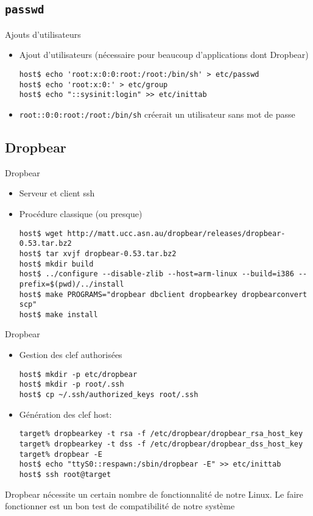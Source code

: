 \subsection{\texttt{passwd}}

\begin{frame}[fragile=singleslide]{Ajouts d'utilisateurs}
  \begin{itemize}
  \item Ajout d'utilisateurs  (nécessaire pour beaucoup d'applications
    dont Dropbear)
    \begin{lstlisting}
host$ echo 'root:x:0:0:root:/root:/bin/sh' > etc/passwd
host$ echo 'root:x:0:' > etc/group
host$ echo "::sysinit:login" >> etc/inittab 
    \end{lstlisting}
  \item  \verb'root::0:0:root:/root:/bin/sh'  créerait un  utilisateur
    sans mot de passe
  \end{itemize}
\end{frame}

\subsection{Dropbear}

\begin{frame}[fragile=singleslide]{Dropbear}
  \begin{itemize}
  \item Serveur et client ssh
  \item Procédure classique (ou presque)
    \begin{lstlisting}
host$ wget http://matt.ucc.asn.au/dropbear/releases/dropbear-0.53.tar.bz2
host$ tar xvjf dropbear-0.53.tar.bz2
host$ mkdir build
host$ ../configure --disable-zlib --host=arm-linux --build=i386 --prefix=$(pwd)/../install
host$ make PROGRAMS="dropbear dbclient dropbearkey dropbearconvert scp"
host$ make install
    \end{lstlisting}
  \end{itemize}
\end{frame}

\begin{frame}[fragile=singleslide]{Dropbear}
  \begin{itemize}
  \item Gestion des clef authorisées
    \begin{lstlisting}
host$ mkdir -p etc/dropbear
host$ mkdir -p root/.ssh
host$ cp ~/.ssh/authorized_keys root/.ssh
    \end{lstlisting}%
  \item Génération des clef host:
    \begin{lstlisting}
target% dropbearkey -t rsa -f /etc/dropbear/dropbear_rsa_host_key
target% dropbearkey -t dss -f /etc/dropbear/dropbear_dss_host_key
target% dropbear -E
host$ echo "ttyS0::respawn:/sbin/dropbear -E" >> etc/inittab
host$ ssh root@target
    \end{lstlisting}
  \end{itemize}
  Dropbear  nécessite un  certain  nombre de  fonctionnalité de  notre
  Linux.  Le faire  fonctionner est  un bon  test de  compatibilité de
  notre système
\end{frame}

